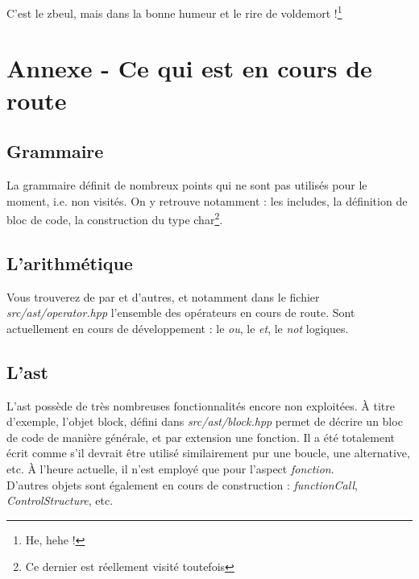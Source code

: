 \documentclass{report}
\begin{document}
C'est le zbeul, mais dans la bonne humeur et le rire de voldemort !\footnote{He, hehe !}

\newpage
\section*{Annexe - Ce qui est en cours de route}
\label{sec:Annexe}
\subsection*{Grammaire}
La grammaire définit de nombreux points qui ne sont pas utilisés pour le moment, i.e. non visités. On y retrouve notamment : les includes, la définition de bloc de code, la construction du type char\footnote{Ce dernier est réellement visité toutefois}.
\subsection*{L'arithmétique}
Vous trouverez de par et d'autres, et notamment dans le fichier \emph{src/ast/operator.hpp} l'ensemble des opérateurs en cours de route. Sont actuellement en cours de développement : le \emph{ou}, le \emph{et}, le \emph{not} logiques.
\subsection*{L'ast}
L'ast possède de très nombreuses fonctionnalités encore non exploitées. À titre d'exemple, l'objet block, défini dans \emph{src/ast/block.hpp} permet de décrire un bloc de code de manière générale, et par extension une fonction. Il a été totalement écrit comme s'il devrait être utilisé similairement pur une boucle, une alternative, etc. À l'heure actuelle, il n'est employé que pour l'aspect \emph{fonction}.\\
D'autres objets sont également en cours de construction : \emph{functionCall}, \emph{ControlStructure}, etc.
\end{document}
